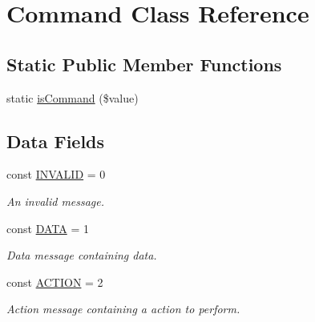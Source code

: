 \hypertarget{class_lora_1_1_server_1_1_command}{}\section{Command Class Reference}
\label{class_lora_1_1_server_1_1_command}
\subsection*{Static Public Member Functions}
\begin{DoxyCompactItemize}
\item 
static \hyperlink{class_lora_1_1_server_1_1_command_a77bf97cc94921f5dc95fa09cc9d87ffe}{is\+Command} (\$value)
\end{DoxyCompactItemize}
\subsection*{Data Fields}
\begin{DoxyCompactItemize}
\item 
\mbox{\label{class_lora_1_1_server_1_1_command_a51c222026c95d22d182a70dffb1274d8}} 
const \hyperlink{class_lora_1_1_server_1_1_command_a51c222026c95d22d182a70dffb1274d8}{I\+N\+V\+A\+L\+ID} = 0
\begin{DoxyCompactList}\small\item\em An invalid message. \end{DoxyCompactList}\item 
\mbox{\label{class_lora_1_1_server_1_1_command_a59322b745f918a8b5f747b08d9d5ddec}} 
const \hyperlink{class_lora_1_1_server_1_1_command_a59322b745f918a8b5f747b08d9d5ddec}{D\+A\+TA} = 1
\begin{DoxyCompactList}\small\item\em Data message containing data. \end{DoxyCompactList}\item 
\mbox{\label{class_lora_1_1_server_1_1_command_aff329be36615a18f3dd0bc2d393dbc2f}} 
const \hyperlink{class_lora_1_1_server_1_1_command_aff329be36615a18f3dd0bc2d393dbc2f}{A\+C\+T\+I\+ON} = 2
\begin{DoxyCompactList}\small\item\em Action message containing a action to perform. \end{DoxyCompactList}\end{DoxyCompactItemize}


